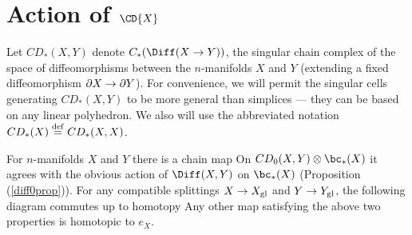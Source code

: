 
\section{Action of \texorpdfstring{$\CD{X}$}{$C_*(Diff(M))$}}
\label{sec:evaluation}

Let $CD_*(X, Y)$ denote $C_*(\Diff(X \to Y))$, the singular chain complex of
the space of diffeomorphisms
between the $n$-manifolds $X$ and $Y$ (extending a fixed diffeomorphism $\partial X \to \partial Y$).
For convenience, we will permit the singular cells generating $CD_*(X, Y)$ to be more general
than simplices --- they can be based on any linear polyhedron.
We also will use the abbreviated notation $CD_*(X) \stackrel{\mathrm{def}}{=} CD_*(X, X)$.

\begin{prop}  \label{CDprop}
For $n$-manifolds $X$ and $Y$ there is a chain map
On $CD_0(X, Y) \otimes \bc_*(X)$ it agrees with the obvious action of $\Diff(X, Y)$ on $\bc_*(X)$
(Proposition (\ref{diff0prop})).
For any compatible splittings $X\to X_\mathrm{gl}$ and $Y\to Y_\mathrm{gl}$, 
the following diagram commutes up to homotopy
Any other map satisfying the above two properties is homotopic to $e_X$.
\end{prop}



